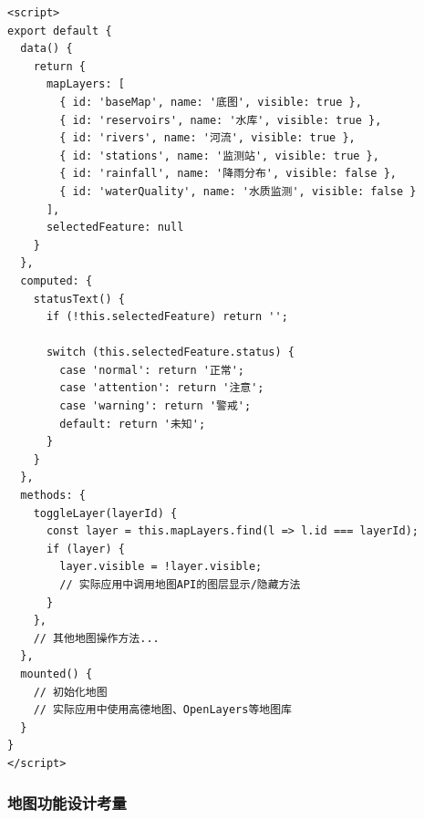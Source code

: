 \begin{lstlisting}
<script>
export default {
  data() {
    return {
      mapLayers: [
        { id: 'baseMap', name: '底图', visible: true },
        { id: 'reservoirs', name: '水库', visible: true },
        { id: 'rivers', name: '河流', visible: true },
        { id: 'stations', name: '监测站', visible: true },
        { id: 'rainfall', name: '降雨分布', visible: false },
        { id: 'waterQuality', name: '水质监测', visible: false }
      ],
      selectedFeature: null
    }
  },
  computed: {
    statusText() {
      if (!this.selectedFeature) return '';
      
      switch (this.selectedFeature.status) {
        case 'normal': return '正常';
        case 'attention': return '注意';
        case 'warning': return '警戒';
        default: return '未知';
      }
    }
  },
  methods: {
    toggleLayer(layerId) {
      const layer = this.mapLayers.find(l => l.id === layerId);
      if (layer) {
        layer.visible = !layer.visible;
        // 实际应用中调用地图API的图层显示/隐藏方法
      }
    },
    // 其他地图操作方法...
  },
  mounted() {
    // 初始化地图
    // 实际应用中使用高德地图、OpenLayers等地图库
  }
}
</script>
\end{lstlisting}

\subsubsection{地图功能设计考量}\label{ux5730ux56feux529fux80fdux8bbeux8ba1ux8003ux91cf}

